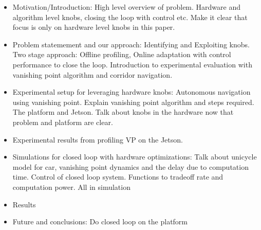 \documentclass{article}[14pt]
\begin{document}
\begin{itemize}
	\item Motivation/Introduction: High level overview of problem. Hardware and algorithm level knobs, closing the loop with control etc. Make it clear that focus is only on hardware level knobs in this paper.
	\item Problem statemement and our approach: Identifying and Exploiting knobs. Two stage approach: Offline profiling, Online adaptation with control performance to close the loop. Introduction to experimental evaluation with vanishing point algorithm and corridor navigation. 
	
	\item Experimental setup for leveraging hardware knobs: Autonomous navigation using vanishing point. Explain vanishing point algorithm and steps required. The platform and Jetson. Talk about knobs in the hardware now that problem and platform are clear. 
	\item Experimental results from profiling VP on the Jetson.
	\item Simulations for closed loop with hardware optimizations: Talk about unicycle model for car, vanishing point dynamics and the delay due to computation time. Control of closed loop system. Functions to tradeoff rate and computation power. All in simulation
	\item Results
	\item Future and conclusions: Do closed loop on the platform		
		
\end{itemize}
\end{document}
